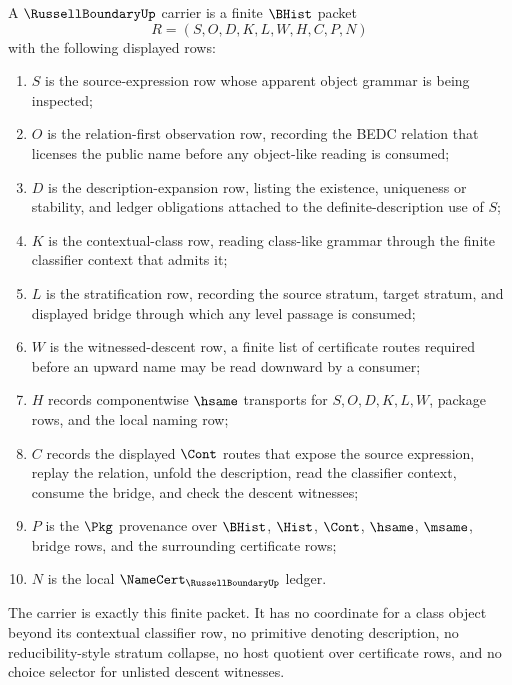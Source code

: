 \begin{definition}
\label{def:russell-boundary-carrier}
A $\RussellBoundaryUp$ carrier is a finite $\BHist$ packet
$$
R=(S,O,D,K,L,W,H,C,P,N)
$$
with the following displayed rows:
\begin{enumerate}
\item $S$ is the source-expression row whose apparent object grammar is being inspected;
\item $O$ is the relation-first observation row, recording the BEDC relation that licenses the public name before any object-like reading is consumed;
\item $D$ is the description-expansion row, listing the existence, uniqueness or stability, and ledger obligations attached to the definite-description use of $S$;
\item $K$ is the contextual-class row, reading class-like grammar through the finite classifier context that admits it;
\item $L$ is the stratification row, recording the source stratum, target stratum, and displayed bridge through which any level passage is consumed;
\item $W$ is the witnessed-descent row, a finite list of certificate routes required before an upward name may be read downward by a consumer;
\item $H$ records componentwise $\hsame$ transports for $S,O,D,K,L,W$, package rows, and the local naming row;
\item $C$ records the displayed $\Cont$ routes that expose the source expression, replay the relation, unfold the description, read the classifier context, consume the bridge, and check the descent witnesses;
\item $P$ is the $\Pkg$ provenance over $\BHist$, $\Hist$, $\Cont$, $\hsame$, $\msame$, bridge rows, and the surrounding certificate rows;
\item $N$ is the local $\NameCert_{\RussellBoundaryUp}$ ledger.
\end{enumerate}
The carrier is exactly this finite packet. It has no coordinate for a class object beyond its contextual classifier row, no primitive denoting description, no reducibility-style stratum collapse, no host quotient over certificate rows, and no choice selector for unlisted descent witnesses.
\end{definition}

